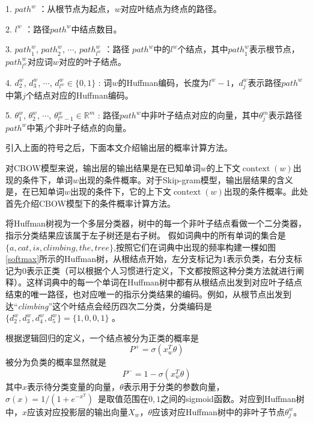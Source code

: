 \begin {itemize}
{
\item[] 1. ${path}^w$ ：从根节点为起点，$w$对应叶结点为终点的路径。

\item[] 2. $l^w$ ：路径${path}^w$中结点数目。

\item[] 3. ${path}_{1}^{w}$, ${path}_{2}^{w}$, $\cdots$, ${path}_{l^w}^{w}$ ：路径 ${path}^w$中的$l^w$个结点，其中${path}_{1}^{w}$表示根节点，${path}_{l^w}^{w}$对应词$w$对应的叶子结点。

\item[] 4. $d_{2}^{w}$, $d_{3}^{w}$, $\cdots$, $d_{l^w}^{w}\in \{0,1\}$ : 词$w$的Huffman编码，长度为$l^w - 1$，$d_{j}^{w}$表示路径${path}^w$中第$j$个结点对应的Huffman编码。

\item[] 5. $\theta_{1}^{w}$, $\theta_{2}^{w}$, $\cdots$, $\theta_{l^w - 1}^{w}\in \mathbb{R}^{m}$ : 路径${path}^w$中非叶子结点对应的向量，其中$\theta_{j}^{m}$表示路径 ${path}^w$中第$j$个非叶子结点的向量。
}
\end {itemize}

引入上面的符号之后，下面本文介绍输出层的概率计算方法。

对CBOW模型来说，输出层的输出结果是在已知单词$w$的上下文$\operatorname {context}(w)$出现的条件下，单词$w$出现的条件概率。对于Skip-gram模型，输出层结果的含义是，在已知单词$w$出现的条件下，它的上下文$\operatorname {context}(w)$出现的条件概率。此处首先介绍CBOW模型下的条件概率计算方法。

将Huffman树视为一个多层分类器，树中的每一个非叶子结点看做一个二分类器，指示分类结果应该属于左子树还是右子树。
假如词典中的所有单词的集合是$\{a,cat,is,climbing,the,tree\}$,按照它们在词典中出现的频率构建一棵如图\ref{softmax}所示的Huffman树，从根结点开始，左分支标记为1表示负类，右分支标记为0表示正类（可以根据个人习惯进行定义，下文都按照这种分类方法就进行阐释）。这样词典中的每一个单词在Huffman树中都有从根结点出发到对应叶子结点结束的唯一路径，也对应唯一的指示分类结果的编码。例如，从根节点出发到达“\emph{climbing}”这个叶结点会经历四次二分类，分类编码是$\{d_{2}^{w}, d_{3}^{w},d_{4}^{w} ,d_{5}^{w}\} = \{1,0,0,1\}$ 。

根据逻辑回归的定义，一个结点被分为正类的概率是
\begin{equation}
P^+ =\sigma(x_{w}^{T}\theta )
\end{equation}
被分为负类的概率显然就是
\begin{equation}
 P^- =1 - \sigma(x_{w}^{T}\theta )
\end{equation}
其中$x$表示待分类变量的向量，$\theta$表示用于分类的参数向量，$\sigma(x) = 1/(1+e^{-x^{T}} )$\
是取值范围在${0,1}$之间的sigmoid函数。对应到Huffman树中，$x$应该对应投影层的输出向量$X_w$，$\theta$应该对应Huffman树中的非叶子节点$\theta_{j}^{w}$。

